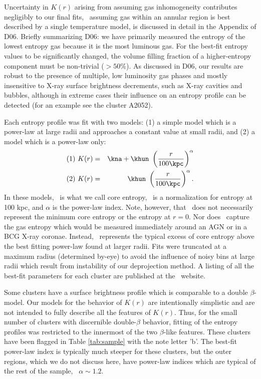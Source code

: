 \documentclass{emulateapj}
\begin{document}
Uncertainty in $K(r)$ arising from assuming gas inhomogeneity
contributes negligibly to our final fits, \eg\ assuming gas within an
annular region is best described by a single temperature model, is
discussed in detail in the Appendix of D06. Briefly summarizing D06:
we have primarily measured the entropy of the lowest entropy gas
because it is the most luminous gas. For the best-fit entropy values
to be significantly changed, the volume filling fraction of a
higher-entropy component must be non-trivial ($> 50\%$). As discussed
in D06, our results are robust to the presence of multiple, low
luminosity gas phases and mostly insensitive to X-ray surface
brightness decrements, such as X-ray cavities and bubbles, although in
extreme cases their influence on an entropy profile can be detected
(for an example see the cluster A2052).

Each entropy profile was fit with two models: (1) a simple model which
is a power-law at large radii and approaches a constant value at small
radii, and (2) a model which is a power-law only:
\begin{eqnarray}
(1)~K(r) &=& \kna + \khun\ \left(\frac{r}{100 \kpc}\right)^{\alpha}\nonumber \\
(2)~K(r) &=& \khun\ \left(\frac{r}{100 \kpc}\right)^{\alpha}.\nonumber
\end{eqnarray}
In these models, \kna\ is what we call core entropy, \khun\ is a
normalization for entropy at 100 kpc, and $\alpha$ is the power-law
index. Note, however, that \kna\ does not necessarily represent the
minimum core entropy or the entropy at $r=0$. Nor does \kna\ capture
the gas entropy which would be measured immediately around an AGN or
in a BCG X-ray coronae. Instead, \kna\ represents the typical excess
of core entropy above the best fitting power-law found at larger
radii. Fits were truncated at a maximum radius (determined by-eye) to
avoid the influence of noisy bins at large radii which result from
instability of our deprojection method. A listing of all the best-fit
parameters for each cluster are published at the \accept\ website.

Some clusters have a surface brightness profile which is comparable to
a double $\beta$-model. Our models for the behavior of $K(r)$ are
intentionally simplistic and are not intended to fully describe all
the features of $K(r)$. Thus, for the small number of clusters with
discernible double-$\beta$ behavior, fitting of the entropy profiles
was restricted to the innermost of the two $\beta$-like
features. These clusters have been flagged in Table \ref{tab:sample}
with the note letter 'b'. The best-fit power-law index is typically
much steeper for these clusters, but the outer regions, which we do
not discuss here, have power-law indices which are typical of the rest
of the sample, \ie\ $\alpha \sim 1.2$.
\end{document}
